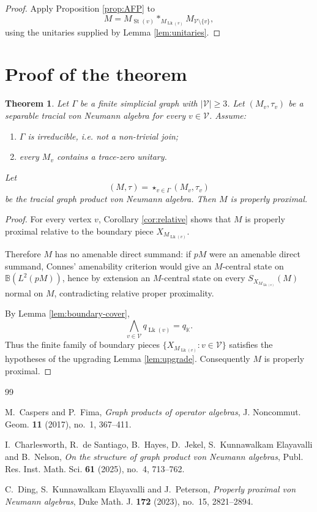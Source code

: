 \documentclass[11pt]{amsart}
\newtheorem{theorem}{Theorem}[section]
\theoremstyle{definition}
\newcommand{\V}{\mathcal V}
\newcommand{\Lk}{\operatorname{Lk}}
\newcommand{\St}{\operatorname{St}}
\newcommand{\B}{\mathbb B}
\newcommand{\K}{\mathbb K}
\newcommand{\freeprod}{\mathop{*}}
\begin{document}
\begin{proof}
Apply Proposition \ref{prop:AFP} to
\[
M
=
M_{\St(v)}
\freeprod_{M_{\Lk(v)}}
M_{\V\setminus\{v\}},
\]
using the unitaries supplied by Lemma \ref{lem:unitaries}.
\end{proof}

\section{Proof of the theorem}

\begin{theorem}
Let $\Gamma$ be a finite simplicial graph with $|\V|\geq 3$.  Let $(M_v,\tau_v)$ be a separable tracial von Neumann algebra for every $v\in \V$.  Assume:
\begin{enumerate}[label=(\alph*)]
\item $\Gamma$ is irreducible, i.e. not a non-trivial join;
\item every $M_v$ contains a trace-zero unitary.
\end{enumerate}
Let
\[
(M,\tau)=\mathop{\star}_{v\in\Gamma}(M_v,\tau_v)
\]
be the tracial graph product von Neumann algebra.  Then $M$ is properly proximal.
\end{theorem}

\begin{proof}
For every vertex $v$, Corollary \ref{cor:relative} shows that $M$ is properly proximal relative to the boundary piece $X_{M_{\Lk(v)}}$.

Therefore $M$ has no amenable direct summand: if $pM$ were an amenable direct summand, Connes' amenability criterion would give an $M$-central state on $\B(L^2(pM))$, hence by extension an $M$-central state on every $S_{X_{M_{\Lk(v)}}}(M)$ normal on $M$, contradicting relative proper proximality.

By Lemma \ref{lem:boundary-cover},
\[
\bigwedge_{v\in\V} q_{\Lk(v)}=q_{\K}.
\]
Thus the finite family of boundary pieces $\{X_{M_{\Lk(v)}}:v\in\V\}$ satisfies the hypotheses of the upgrading Lemma \ref{lem:upgrade}.  Consequently $M$ is properly proximal.
\end{proof}

\begin{thebibliography}{99}

M.~Caspers and P.~Fima,
\emph{Graph products of operator algebras},
J. Noncommut. Geom. \textbf{11} (2017), no.~1, 367--411.

I.~Charlesworth, R.~de Santiago, B.~Hayes, D.~Jekel,
S.~Kunnawalkam Elayavalli and B.~Nelson,
\emph{On the structure of graph product von Neumann algebras},
Publ. Res. Inst. Math. Sci. \textbf{61} (2025), no.~4, 713--762.

C.~Ding, S.~Kunnawalkam Elayavalli and J.~Peterson,
\emph{Properly proximal von Neumann algebras},
Duke Math. J. \textbf{172} (2023), no.~15, 2821--2894.

\end{thebibliography}
\end{document}
